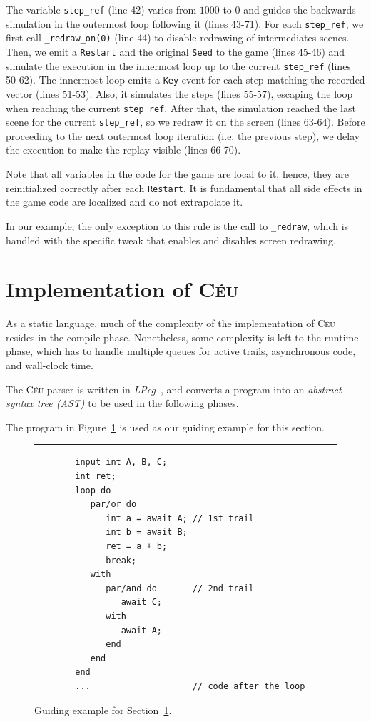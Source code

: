 \documentclass[11pt,a4paper]{article}
\newcommand{\2}{\;\;}
\newcommand{\5}{\;\;\;\;\;}
\newcommand{\CEU}{\textsc{C\'{e}u}}
\newcommand{\code}[1] {{\small{\texttt{#1}}}}
\begin{document}
The variable \code{step\_ref} (line 42) varies from $1000$ to $0$ and guides 
the backwards simulation in the outermost loop following it (lines 43-71).
For each \code{step\_ref}, we first call \code{\_redraw\_on(0)} (line 44) to 
disable redrawing of intermediates scenes.
Then, we emit a \code{Restart} and the original \code{Seed} to the game (lines 
45-46) and simulate the execution in the innermost loop up to the current 
\code{step\_ref} (lines 50-62).
The innermost loop emits a \code{Key} event for each step matching the recorded 
vector (lines 51-53).
Also, it simulates the steps (lines 55-57), escaping the loop when reaching the 
current \code{step\_ref}.
After that, the simulation reached the last scene for the current 
\code{step\_ref}, so we redraw it on the screen (lines 63-64).
Before proceeding to the next outermost loop iteration (i.e. the previous 
step), we delay the execution to make the replay visible (lines 66-70).

Note that all variables in the code for the game are local to it, hence, they 
are reinitialized correctly after each \code{Restart}.
It is fundamental that all side effects in the game code are localized and do 
not extrapolate it.

In our example, the only exception to this rule is the call to \code{\_redraw}, 
which is handled with the specific tweak that enables and disables screen 
redrawing.

\section{Implementation of \CEU}
\label{sec:impl}

As a static language, much of the complexity of the implementation of \CEU{} 
resides in the compile phase.
Nonetheless, some complexity is left to the runtime phase, which has to handle 
multiple queues for active trails, asynchronous code, and wall-clock time.

The \CEU{} parser is written in \emph{LPeg}~\cite{lua.lpeg}, and converts a 
program into an \emph{abstract syntax tree (AST)} to be used in the following 
phases.

The program in Figure~\ref{lst:impl} is used as our guiding example for this 
section.

\begin{figure}[h]
\rule{15cm}{0.37pt}
{\small
\begin{verbatim}
        input int A, B, C;
        int ret;
        loop do
           par/or do
              int a = await A; // 1st trail
              int b = await B;
              ret = a + b;
              break;
           with
              par/and do       // 2nd trail
                 await C;
              with
                 await A;
              end
           end
        end
        ...                    // code after the loop
\end{verbatim}
}
\caption{ Guiding example for Section~\ref{sec:impl}.
\label{lst:impl}
}
\end{figure}
\end{document}
